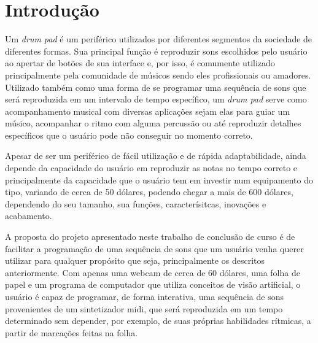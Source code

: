 \documentclass[12pt]{report}
\begin{document}
\listoffigures

\newpage


\tableofcontents




\newpage



\chapter{Introdução}
\label{cha:introducao}

Um {\it drum pad} é um periférico utilizados por diferentes segmentos da sociedade de diferentes formas. Sua principal função é reproduzir sons escolhidos pelo usuário ao apertar de botões de sua interface e, por isso, é comumente utilizado principalmente pela comunidade de músicos sendo eles profissionais ou amadores.
Utilizado também como uma forma de se programar uma sequência de sons que será reproduzida em um intervalo de tempo específico, um {\it drum pad} serve como acompanhamento musical com diversas aplicações sejam elas para guiar um músico, acompanhar o ritmo com alguma percussão ou até reproduzir detalhes específicos que o usuário pode não conseguir no momento correto.

Apesar de ser um periférico de fácil utilização e de rápida adaptabilidade, ainda depende da capacidade do usuário em reproduzir as notas no tempo correto e principalmente da capacidade que o usuário tem em investir num equipamento do tipo, variando de cerca de 50 dólares, podendo chegar a mais de 600 dólares, dependendo do seu tamanho, sua funções, caracterísitcas, inovações e acabamento.

A proposta do projeto apresentado neste trabalho de conclusão de curso é de facilitar a programação de uma sequência de sons que um usuário venha querer utilizar para qualquer propósito que seja, principalmente os descritos anteriormente. Com apenas uma webcam de cerca de 60 dólares, uma folha de papel e um programa de computador que utiliza conceitos de visão artificial, o usuário é capaz de programar, de forma interativa, uma sequência de sons provenientes de um sintetizador midi, que será reproduzida em um tempo determinado sem depender, por exemplo, de suas próprias habilidades rítmicas, a partir de marcações feitas na folha.
\end{document}
